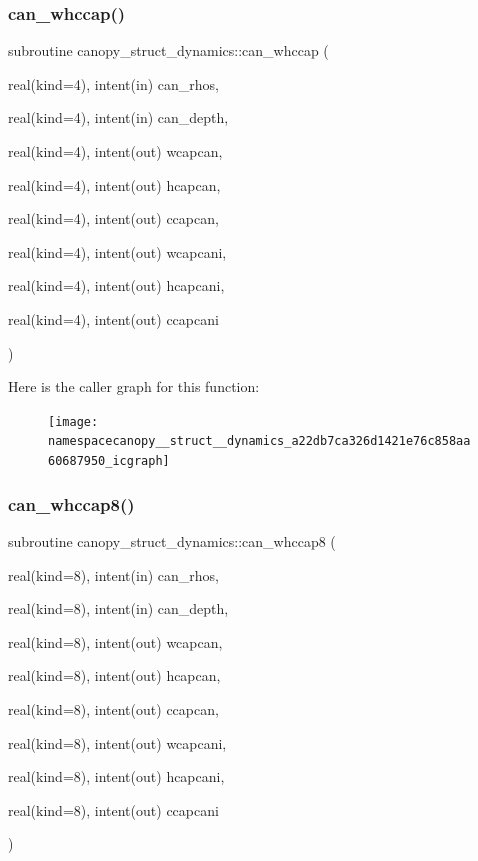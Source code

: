 \subsubsection{\texorpdfstring{can\+\_\+whccap()}{can\_whccap()}}
{\footnotesize\ttfamily subroutine canopy\+\_\+struct\+\_\+dynamics\+::can\+\_\+whccap (\begin{DoxyParamCaption}\item[{real(kind=4), intent(in)}]{can\+\_\+rhos,  }\item[{real(kind=4), intent(in)}]{can\+\_\+depth,  }\item[{real(kind=4), intent(out)}]{wcapcan,  }\item[{real(kind=4), intent(out)}]{hcapcan,  }\item[{real(kind=4), intent(out)}]{ccapcan,  }\item[{real(kind=4), intent(out)}]{wcapcani,  }\item[{real(kind=4), intent(out)}]{hcapcani,  }\item[{real(kind=4), intent(out)}]{ccapcani }\end{DoxyParamCaption})}

Here is the caller graph for this function\+:
\nopagebreak
\begin{figure}[H]
\begin{center}
\leavevmode
\texttt{[image: namespacecanopy\_\_struct\_\_dynamics\_a22db7ca326d1421e76c858aa60687950\_icgraph]}
\end{center}
\end{figure}
\mbox{\label{namespacecanopy__struct__dynamics_a006df1e2d1da5f482047ab4e18c561ef}} 
\subsubsection{\texorpdfstring{can\+\_\+whccap8()}{can\_whccap8()}}
{\footnotesize\ttfamily subroutine canopy\+\_\+struct\+\_\+dynamics\+::can\+\_\+whccap8 (\begin{DoxyParamCaption}\item[{real(kind=8), intent(in)}]{can\+\_\+rhos,  }\item[{real(kind=8), intent(in)}]{can\+\_\+depth,  }\item[{real(kind=8), intent(out)}]{wcapcan,  }\item[{real(kind=8), intent(out)}]{hcapcan,  }\item[{real(kind=8), intent(out)}]{ccapcan,  }\item[{real(kind=8), intent(out)}]{wcapcani,  }\item[{real(kind=8), intent(out)}]{hcapcani,  }\item[{real(kind=8), intent(out)}]{ccapcani }\end{DoxyParamCaption})}

